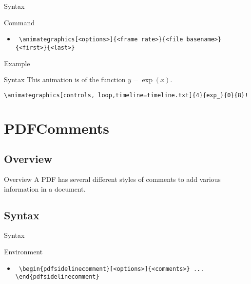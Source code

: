 \documentclass[article]{beamer}
\begin{document}
\begin{frame}[fragile]{Syntax}

\begin{block}{Command}

\begin{itemize}
\item \verb! \animategraphics[<options>]{<frame rate>}{<file basename>}{<first>}{<last>}!
\end{itemize}

\end{block}

\end{frame}

\begin{frame}[fragile]{Example}

\begin{block}{Syntax}
This animation is of the function $y=\exp(x)$.
\begin{verbatim}
\animategraphics[controls, loop,timeline=timeline.txt]{4}{exp_}{0}{8}!
\end{verbatim}

\end{block}

\end{frame}


\section{PDFComments}
\subsection{Overview}

\begin{frame}[fragile]{}

\begin{block}{Overview}
A PDF has several different styles of comments to add various information in a document.
\end{block}

\end{frame}

\subsection{Syntax}

\begin{frame}[fragile]{Syntax}

\begin{block}{Environment}

\begin{itemize}
\item \verb! \begin{pdfsidelinecomment}[<options>]{<comments>} ... \end{pdfsidelinecomment}!
\end{itemize}

\end{block}

\end{frame}
\end{document}
